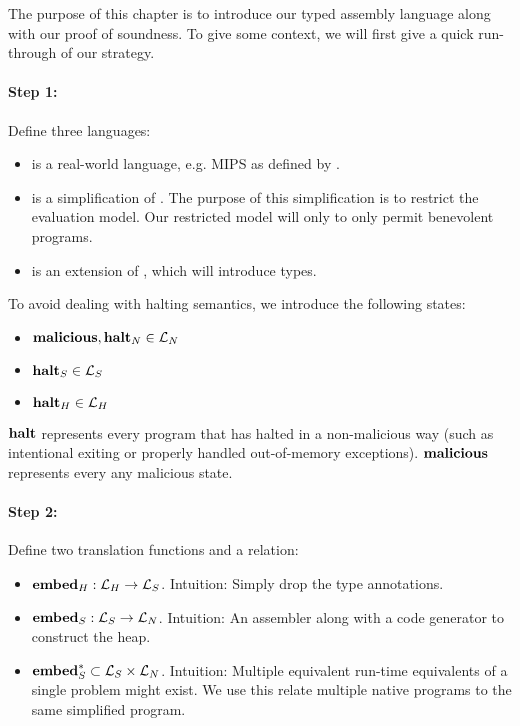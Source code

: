 The purpose of this chapter is to introduce our typed assembly language along
with our proof of soundness. To give some context, we will first give a quick
run-through of our strategy.

\paragraph{Step 1:} Define three languages:

\begin{itemize}
\item \nativelang is a real-world language, e.g. MIPS as defined by
  \cite{mipssys}.
\item \simplelang is a simplification of \nativelang. The purpose of
  this simplification is to restrict the evaluation model. Our restricted model
  will only to only permit benevolent programs.
\item \highlang is an extension of \simplelang, which will
  introduce types.
\end{itemize}

To avoid dealing with halting semantics, we introduce the following states:
\begin{itemize}
\item ${\mathbf{malicious}}, {\mathbf{halt}_N} \in \mathcal{L}_N$
\item ${\mathbf{halt}_S} \in \mathcal{L}_S$
\item ${\mathbf{halt}_H} \in \mathcal{L}_H$
\end{itemize}

${\mathbf{halt}}$ represents every program that has halted in a non-malicious way (such as
intentional exiting or properly handled out-of-memory exceptions). ${\mathbf{malicious}}$
represents every any malicious state.

\paragraph{Step 2:} Define two translation functions and a relation:

\begin{itemize}
\item ${{\mathbf{embed}}_H} : \mathcal{L}_H -> \mathcal{L}_S$. Intuition: Simply drop the type
  annotations.
\item ${{\mathbf{embed}}_S} : \mathcal{L}_S -> \mathcal{L}_N$. Intuition: An assembler
  along with a code generator to construct the heap.
\item ${\mathbf{embed}^\ast_S} \subset \mathcal{L}_S \times \mathcal{L}_N$. Intuition:
  Multiple equivalent run-time equivalents of a single problem might exist. We
  use this relate multiple native programs to the same simplified program.
\end{itemize}

